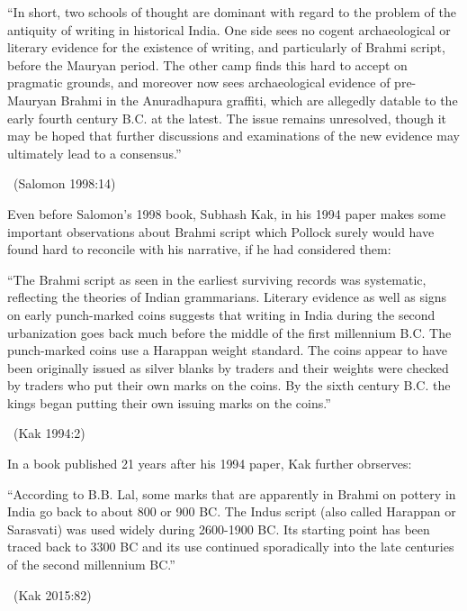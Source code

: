 \begin{myquote}
“In short, two schools of thought are dominant with regard to the problem of the antiquity of writing in historical India. One side sees no cogent archaeological or literary evidence for the existence of writing, and particularly of Brahmi script, before the Mauryan period. The other camp finds this hard to accept on pragmatic grounds, and moreover now sees archaeological evidence of pre-Mauryan Brahmi in the Anuradhapura graffiti, which are allegedly datable to the early fourth century B.C. at the latest. The issue remains unresolved, though it may be hoped that further discussions and examinations of the new evidence may ultimately lead to a consensus.” 

~\hfill (Salomon 1998:14)
\end{myquote}

Even before Salomon’s 1998 book, Subhash Kak, in his 1994 paper makes some important observations about Brahmi script which Pollock surely would have found hard to reconcile with his narrative, if he had considered them:

\begin{myquote}
“The Brahmi script as seen in the earliest surviving records was systematic, reflecting the theories of Indian grammarians. Literary evidence as well as signs on early punch-marked coins suggests that writing in India during the second urbanization goes back much before the middle of the first millennium B.C. The punch-marked coins use a Harappan weight standard. The coins appear to have been originally issued as silver blanks by traders and their weights were checked by traders who put their own marks on the coins. By the sixth century B.C. the kings began putting their own issuing marks on the coins.” 

~\hfill (Kak 1994:2)
\end{myquote}

In a book published 21 years after his 1994 paper, Kak further obrserves:

\begin{myquote}
“According to B.B. Lal, some marks that are apparently in Brahmi on pottery in India go back to about 800 or 900 BC. The Indus script (also called Harappan or Sarasvati) was used widely during 2600-1900 BC. Its starting point has been traced back to 3300 BC and its use continued sporadically into the late centuries of the second millennium BC.” 

~\hfill (Kak 2015:82)
\end{myquote}

